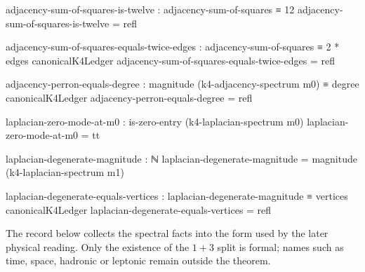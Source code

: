 \documentclass[11pt]{article}
\begin{document}
\begin{code}
adjacency-sum-of-squares-is-twelve :
  adjacency-sum-of-squares ≡ 12
adjacency-sum-of-squares-is-twelve = refl

adjacency-sum-of-squares-equals-twice-edges :
  adjacency-sum-of-squares ≡ 2 * edges canonicalK4Ledger
adjacency-sum-of-squares-equals-twice-edges = refl

adjacency-perron-equals-degree :
  magnitude (k4-adjacency-spectrum m0) ≡ degree canonicalK4Ledger
adjacency-perron-equals-degree = refl

laplacian-zero-mode-at-m0 :
  is-zero-entry (k4-laplacian-spectrum m0)
laplacian-zero-mode-at-m0 = tt

laplacian-degenerate-magnitude : ℕ
laplacian-degenerate-magnitude = magnitude (k4-laplacian-spectrum m1)

laplacian-degenerate-equals-vertices :
  laplacian-degenerate-magnitude ≡ vertices canonicalK4Ledger
laplacian-degenerate-equals-vertices = refl
\end{code}

The record below collects the spectral facts into the form used by the later
physical reading.  Only the existence of the $1+3$ split is formal; names such
as time, space, hadronic or leptonic remain outside the theorem.
\end{document}
